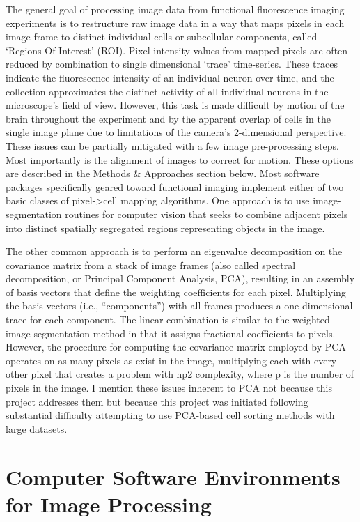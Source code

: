 \documentclass[
  12pt,
  lettersizepaper,
]{book}
\begin{document}
The general goal of processing image data from functional fluorescence
imaging experiments is to restructure raw image data in a way that maps
pixels in each image frame to distinct individual cells or subcellular
components, called `Regions-Of-Interest' (ROI). Pixel-intensity values
from mapped pixels are often reduced by combination to single
dimensional `trace' time-series. These traces indicate the fluorescence
intensity of an individual neuron over time, and the collection
approximates the distinct activity of all individual neurons in the
microscope's field of view. However, this task is made difficult by
motion of the brain throughout the experiment and by the apparent
overlap of cells in the single image plane due to limitations of the
camera's 2-dimensional perspective. These issues can be partially
mitigated with a few image pre-processing steps. Most importantly is the
alignment of images to correct for motion. These options are described
in the Methods \& Approaches section below. Most software packages
specifically geared toward functional imaging implement either of two
basic classes of pixel-\textgreater{}cell mapping algorithms. One
approach is to use image-segmentation routines for computer vision that
seeks to combine adjacent pixels into distinct spatially segregated
regions representing objects in the image.

The other common approach is to perform an eigenvalue decomposition on
the covariance matrix from a stack of image frames (also called spectral
decomposition, or Principal Component Analysis, PCA), resulting in an
assembly of basis vectors that define the weighting coefficients for
each pixel. Multiplying the basis-vectors (i.e., ``components'') with
all frames produces a one-dimensional trace for each component. The
linear combination is similar to the weighted image-segmentation method
in that it assigns fractional coefficients to pixels. However, the
procedure for computing the covariance matrix employed by PCA operates
on as many pixels as exist in the image, multiplying each with every
other pixel that creates a problem with np2 complexity, where p is the
number of pixels in the image. I mention these issues inherent to PCA
not because this project addresses them but because this project was
initiated following substantial difficulty attempting to use PCA-based
cell sorting methods with large datasets.

\hypertarget{sec:computer-software-environments-for-image-processing}{%
\section{Computer Software Environments for Image
Processing}\label{sec:computer-software-environments-for-image-processing}}
\end{document}
